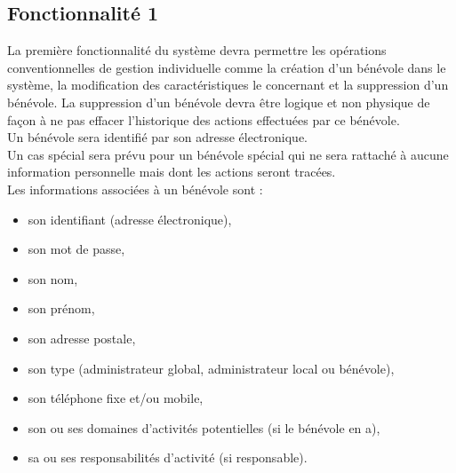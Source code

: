 \subsection{Fonctionnalité 1}
La première fonctionnalité du système devra permettre les opérations conventionnelles de gestion individuelle comme la création d'un bénévole dans le système, la modification des caractéristiques le concernant et la suppression d'un bénévole. La suppression d'un bénévole devra être logique et non physique de façon à ne pas effacer l'historique des actions effectuées par ce bénévole. \\
Un bénévole sera identifié par son adresse électronique.\\ 
Un cas spécial sera prévu pour un bénévole spécial qui ne sera rattaché à aucune information personnelle mais dont les actions seront tracées.\\
Les informations associées à un bénévole sont :
\begin{itemize}
\item son identifiant (adresse électronique),
\item son mot de passe,
\item son nom,
\item son prénom,
\item son adresse postale,
\item son type (administrateur global, administrateur local ou bénévole),
\item son téléphone fixe et/ou mobile,
\item son ou ses domaines d'activités potentielles (si le bénévole en a),
\item sa ou ses responsabilités d'activité (si responsable).
\\
\end{itemize}

